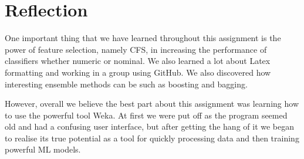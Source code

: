 \section{Reflection}


One important thing that we have learned throughout this assignment is the power of feature selection, namely CFS, in increasing the performance of classifiers whether numeric or nominal. We also learned a lot about Latex formatting and working in a group using GitHub. We also discovered how interesting ensemble methods can be such as boosting and bagging.

However, overall we believe the best part about this assignment was learning how to use the powerful tool Weka. At first we were put off as the program seemed old and had a confusing user interface, but after getting the hang of it we began to realise its true potential as a tool for quickly processing data and then training powerful ML models.
